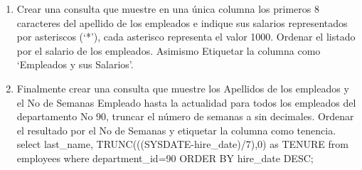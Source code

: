 \begin{enumerate}[1.]
\begin{center}
	\end{center}
	\item Crear una consulta que muestre en una única columna los primeros 8 caracteres del apellido de los empleados e indique sus salarios representados por asteriscos (‘*’), cada asterisco representa el valor 1000. Ordenar el listado por el salario de los empleados. Asimismo Etiquetar la columna como ‘Empleados y sus Salarios’.
	\item Finalmente crear una consulta que muestre los Apellidos de los empleados y el No de Semanas Empleado hasta la actualidad para todos los empleados del departamento No 90, truncar el número de semanas a sin decimales. Ordenar el resultado por el No de Semanas y etiquetar la columna como tenencia.
	\\select last\_name, TRUNC(((SYSDATE-hire\_date)/7),0) as TENURE from employees where department\_id=90 ORDER BY hire\_date DESC;
\end{enumerate}

